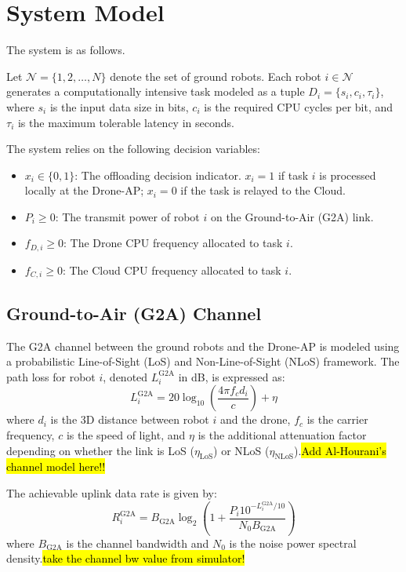 \section{System Model}
The system is as follows.

Let $\mathcal{N} = \{1, 2, \dots, N\}$ denote the set of ground robots. Each robot $i \in \mathcal{N}$ generates a computationally intensive task modeled as a tuple $D_i = \{s_i, c_i, \tau_i\}$, where $s_i$ is the input data size in bits, $c_i$ is the required CPU cycles per bit, and $\tau_i$ is the maximum tolerable latency in seconds.

The system relies on the following decision variables:
\begin{itemize}
    \item $x_i \in \{0, 1\}$: The offloading decision indicator. $x_i = 1$ if task $i$ is processed locally at the Drone-AP; $x_i = 0$ if the task is relayed to the Cloud.
    \item $P_i \ge 0$: The transmit power of robot $i$ on the Ground-to-Air (G2A) link.
    \item $f_{D,i} \ge 0$: The Drone CPU frequency allocated to task $i$.
    \item $f_{C,i} \ge 0$: The Cloud CPU frequency allocated to task $i$.
\end{itemize}
\subsection{Ground-to-Air (G2A) Channel}
The G2A channel between the ground robots and the Drone-AP is modeled using a probabilistic Line-of-Sight (LoS) and Non-Line-of-Sight (NLoS) framework. The path loss for robot $i$, denoted $L^{\text{G2A}}_i$ in dB, is expressed as:
\begin{equation}
L^{\text{G2A}}_i = 20 \log_{10}\left(\frac{4\pi f_c d_i}{c}\right) + \eta
\end{equation}
where $d_i$ is the 3D distance between robot $i$ and the drone, $f_c$ is the carrier frequency, $c$ is the speed of light, and $\eta$ is the additional attenuation factor depending on whether the link is LoS ($\eta_{\text{LoS}}$) or NLoS ($\eta_{\text{NLoS}}$).\hl{Add Al-Hourani's channel model here!!}

The achievable uplink data rate is given by:
\begin{equation}
R^{\text{G2A}}_i = B_{\text{G2A}} \log_2 \left( 1 + \frac{P_i 10^{-L^{\text{G2A}}_i/10}}{N_0 B_{\text{G2A}}} \right)
\end{equation}
where $B_{\text{G2A}}$ is the channel bandwidth and $N_0$ is the noise power spectral density.\hl{take the channel bw value from simulator!}

